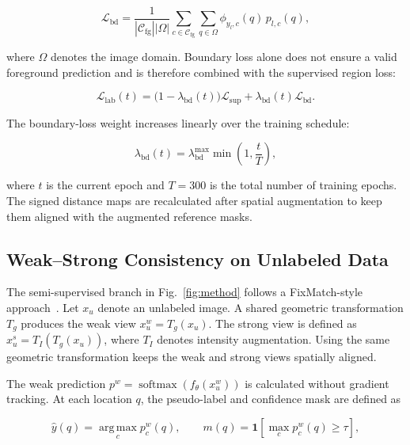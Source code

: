 \documentclass[runningheads]{llncs}
\begin{document}
\begin{equation}
\mathcal{L}_{\mathrm{bd}}
=
\frac{1}
{|\mathcal{C}_{\mathrm{fg}}||\Omega|}
\sum_{c\in\mathcal{C}_{\mathrm{fg}}}
\sum_{q\in\Omega}
\phi_{y_l,c}(q)\,
p_{l,c}(q),
\end{equation}

where $\Omega$ denotes the image domain. Boundary loss alone does not
ensure a valid foreground prediction and is therefore combined with
the supervised region loss:

\begin{equation}
\mathcal{L}_{\mathrm{lab}}(t)
=
\bigl(1-\lambda_{\mathrm{bd}}(t)\bigr)
\mathcal{L}_{\mathrm{sup}}
+
\lambda_{\mathrm{bd}}(t)
\mathcal{L}_{\mathrm{bd}}.
\end{equation}

The boundary-loss weight increases linearly over the training schedule:

\begin{equation}
\lambda_{\mathrm{bd}}(t)
=
\lambda_{\mathrm{bd}}^{\max}
\min\left(1,\frac{t}{T}\right),
\end{equation}

where $t$ is the current epoch and $T=300$ is the total number of
training epochs. The signed distance maps are recalculated after
spatial augmentation to keep them aligned with the augmented reference
masks.

\subsection{Weak--Strong Consistency on Unlabeled Data}

The semi-supervised branch in Fig.~\ref{fig:method} follows a
FixMatch-style approach~\cite{ref_fixmatch}. Let $x_u$ denote an
unlabeled image. A shared geometric transformation $T_g$ produces the
weak view $x_u^w=T_g(x_u)$. The strong view is defined as
$x_u^s=T_I(T_g(x_u))$, where $T_I$ denotes intensity augmentation.
Using the same geometric transformation keeps the weak and strong views
spatially aligned.

The weak prediction
$p^w=\operatorname{softmax}(f_\theta(x_u^w))$ is calculated without
gradient tracking. At each location $q$, the pseudo-label and
confidence mask are defined as

\begin{equation}
\hat{y}(q)
=
\operatorname*{arg\,max}_{c}p_c^w(q),
\qquad
m(q)
=
\mathbf{1}
\left[
\max_c p_c^w(q)\geq\tau
\right],
\end{equation}
\end{document}
